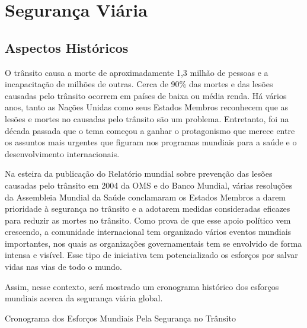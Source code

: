 \chapter{Segurança Viária}

\section{Aspectos Históricos}

O trânsito causa a morte de aproximadamente 1,3 milhão de pessoas e a incapacitação de milhões de outras. Cerca de 90\% das mortes e das lesões causadas pelo trânsito ocorrem em países de baixa ou média renda. Há vários anos, tanto as Nações Unidas como seus Estados Membros reconhecem que as lesões e mortes no causadas pelo trânsito são um problema. Entretanto, foi na década passada que o tema começou a ganhar o protagonismo que merece entre os assuntos mais urgentes que ﬁguram nos programas mundiais para a saúde e o desenvolvimento internacionais.\vskip0.3cm


Na esteira da publicação do Relatório mundial sobre prevenção das lesões causadas pelo trânsito em 2004 da OMS e do Banco Mundial, várias resoluções da Assembleia Mundial da Saúde conclamaram os Estados Membros a darem prioridade à segurança no trânsito e a adotarem medidas consideradas eﬁcazes para reduzir as mortes no trânsito. Como prova de que esse apoio político vem crescendo, a comunidade internacional tem organizado vários eventos mundiais importantes, nos quais as organizações governamentais tem se envolvido de forma intensa e visível. Esse tipo de iniciativa tem potencializado os esforços por salvar vidas nas vias de todo o mundo.\vskip0.3cm


Assim, nesse contexto, será mostrado um cronograma histórico dos esforços mundiais acerca da segurança viária global.\vskip0.3cm

 
Cronograma dos Esforços Mundiais Pela Segurança no Trânsito 

